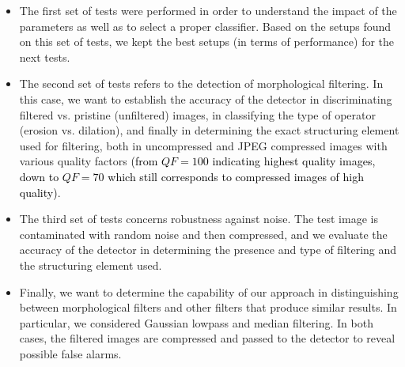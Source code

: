 \documentclass{ieeeaccess}
\newcommand{\revisedtext}[1]{\textcolor{black}{#1}}
\begin{document}
\begin{itemize}
	\item The first set of tests were performed in order to understand the impact of the parameters as well as to select a proper classifier. Based on the setups found on this set of tests, we kept the best setups (in terms of performance) for the next tests.
	
	\item The second set of tests refers to the detection of morphological filtering. In this case, we want to establish the accuracy of the detector in discriminating filtered vs. pristine (unfiltered) images, in classifying the type of operator (erosion vs. dilation), and finally in determining the exact structuring element used for filtering, both in uncompressed and JPEG compressed images with various quality factors \revisedtext{(from $QF=100$ indicating highest quality images, down to $QF=70$ which still corresponds to compressed images of high quality)}. 
	
	\item The third set of tests concerns robustness against noise. The test image is contaminated with random noise and then compressed, and we evaluate the accuracy of the detector in determining the presence and type of filtering and the structuring element used.
	
	\item Finally, we want to determine the capability of our approach in distinguishing between morphological filters and other filters that produce similar results. In particular, we considered Gaussian lowpass and median filtering. In both cases, the filtered images are compressed and passed to the detector to reveal possible false alarms.
	
\end{itemize}
\end{document}
